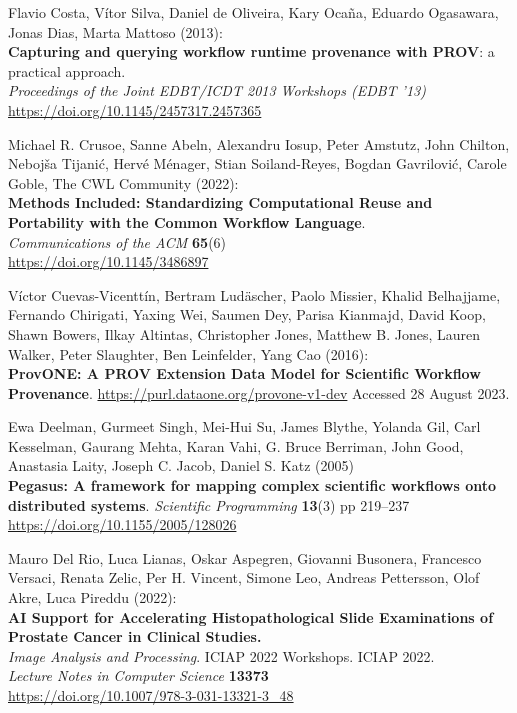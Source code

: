 \documentclass[10pt,letterpaper]{article}
\begin{document}
\begin{thebibliography}{10}
\begin{small}
Flavio Costa, Vítor Silva, Daniel de Oliveira, Kary Ocaña, Eduardo Ogasawara, Jonas Dias, Marta Mattoso (2013):\\
\textbf{Capturing and querying workflow runtime provenance with PROV}: a practical approach.\\
\emph{Proceedings of the Joint EDBT/ICDT 2013 Workshops (EDBT '13)}\\
\url{https://doi.org/10.1145/2457317.2457365} 

Michael R. Crusoe, Sanne Abeln, Alexandru Iosup, Peter Amstutz, John Chilton, Nebojša Tijanić, Hervé Ménager, Stian Soiland-Reyes, Bogdan Gavrilović, Carole Goble, The CWL Community
(2022):\\
\textbf{Methods Included: Standardizing Computational Reuse and
Portability with the Common Workflow Language}.\\
\emph{Communications of the ACM} \textbf{65}(6)\\
\url{https://doi.org/10.1145/3486897}

Víctor Cuevas-Vicenttín, Bertram Ludäscher, Paolo Missier, Khalid Belhajjame, Fernando Chirigati, Yaxing Wei, Saumen Dey, Parisa Kianmajd, David Koop, Shawn Bowers, Ilkay Altintas, Christopher Jones, Matthew B. Jones, Lauren Walker, Peter Slaughter, Ben Leinfelder, Yang Cao (2016):\\
\textbf{ProvONE: A PROV Extension Data Model for Scientific Workflow Provenance}.
\url{https://purl.dataone.org/provone-v1-dev}
Accessed 28 August 2023.

Ewa Deelman, Gurmeet Singh, Mei-Hui Su, James Blythe, Yolanda Gil, Carl Kesselman, Gaurang Mehta, Karan Vahi, G. Bruce Berriman, John Good, Anastasia Laity, Joseph C. Jacob, Daniel S. Katz (2005)\\
\textbf{Pegasus: A framework for mapping complex scientific workflows onto distributed systems}.
\emph{Scientific Programming} \textbf{13}(3) pp 219–237\\
\url{https://doi.org/10.1155/2005/128026}

Mauro Del Rio, Luca Lianas, Oskar Aspegren, Giovanni Busonera, Francesco Versaci, Renata Zelic, Per H. Vincent, Simone Leo, Andreas Pettersson, Olof Akre, Luca Pireddu (2022):\\
\textbf{AI Support for Accelerating Histopathological Slide Examinations of Prostate Cancer in Clinical Studies.}\\
\emph{Image Analysis and Processing}. ICIAP 2022 Workshops. ICIAP 2022. \\
\emph{Lecture Notes in Computer Science} \textbf{13373}\\
\url{https://doi.org/10.1007/978-3-031-13321-3_48}


\end{small}
\end{thebibliography}
\end{document}
